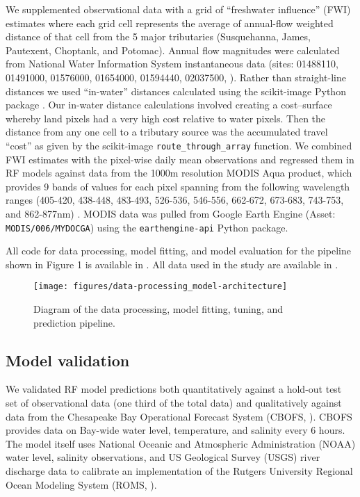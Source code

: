 \documentclass{article}
\begin{document}
We supplemented observational data with a grid of “freshwater influence” (FWI) estimates where each grid cell represents the average of annual-flow weighted distance of that cell from the 5 major tributaries (Susquehanna, James, Pautexent, Choptank, and Potomac). Annual flow magnitudes were calculated from National Water Information System instantaneous data (sites: 01488110, 01491000, 01576000, 01654000, 01594440, 02037500, \cite{nwis2021usgs}). Rather than straight-line distances we used “in-water” distances calculated using the scikit-image Python package \cite{littleKrigingEstuariesCrow1997,vanderwaltScikitimageImageProcessing2014}. Our in-water distance calculations involved creating a cost–surface whereby land pixels had a very high cost relative to water pixels. Then the distance from any one cell to a tributary source was the accumulated travel “cost” as given by the scikit-image \texttt{route\_through\_array} function. We combined FWI estimates with the pixel-wise daily mean observations and regressed them in RF models against data from the 1000m resolution MODIS Aqua product, which provides 9 bands of values for each pixel spanning from the following wavelength ranges (405-420, 438-448, 483-493, 526-536, 546-556, 662-672, 673-683, 743-753, and 862-877nm) \cite{vermoteericMOD09GAMODISTerra2015}. MODIS data was pulled from Google Earth Engine (Asset: \texttt{MODIS/006/MYDOCGA}) using the \texttt{earthengine-api} Python package.

All code for data processing, model fitting, and model evaluation for the pipeline shown in Figure 1 is available in \cite{jemma_stachelek_2022_7332559}. All data used in the study are available in \cite{stachelekjemmachesapeake}.

\begin{figure}[ht!]
    \begin{center}
          \texttt{[image: figures/data-processing\_model-architecture]}
          \caption{Diagram of the data processing, model fitting, tuning, and prediction pipeline.}
    \end{center}    
\end{figure}

\subsection{Model validation}

We validated RF model predictions both quantitatively against a hold-out test set of observational data (one third of the total data) and qualitatively against data from the Chesapeake Bay Operational Forecast System (CBOFS, \cite{lanerolle2011second}). CBOFS provides data on Bay-wide water level, temperature, and salinity every 6 hours. The model itself uses National Oceanic and Atmospheric Administration (NOAA) water level, salinity observations, and US Geological Survey (USGS) river discharge data to calibrate an implementation of the Rutgers University Regional Ocean Modeling System (ROMS, \cite{shchepetkinRegionalOceanicModeling2005}).
\end{document}

